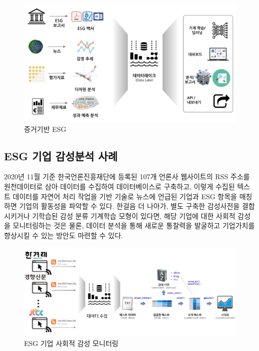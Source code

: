 \documentclass[smallextended]{svjour3}       %
\begin{document}
\begin{figure}

{\centering \includegraphics[width=1\linewidth]{fig/esg-powered-by-data} 

}

\caption{증거기반 ESG}\label{fig:esg-data-driven}
\end{figure}

\hypertarget{esg-sentiment-analysis}{%
\subsection{ESG 기업 감성분석 사례}\label{esg-sentiment-analysis}}

2020년 11월 기준 한국언론진흥재단에 등록된 107개 언론사 웹사이트의 RSS
주소를 원천데이터로 삼아 데이터를 수집하여 데이터베이스로 구축하고,
이렇게 수집된 텍스트 데이터를 자연어 처리 작업을 기반 기술로 뉴스에
언급된 기업과 ESG 항목을 매칭하면 기업의 활동성을 파악할 수 있다. 한걸음
더 나아가, 별도 구축한 감성사전을 결합시키거나 기학습된 감성 분류
기계학습 모형이 있다면, 해당 기업에 대한 사회적 감성을 모니터링하는 것은
물론, 데이터 분석을 통해 새로운 통찰력을 발굴하고 기업가치를 향상시킬 수
있는 방안도 마련할 수 있다.

\begin{figure}

{\centering \includegraphics[width=1\linewidth]{fig/esg-sentiment-analysis} 

}

\caption{ESG 기업 사회적 감성 모니터링}\label{fig:esg-sentiment}
\end{figure}
\end{document}
